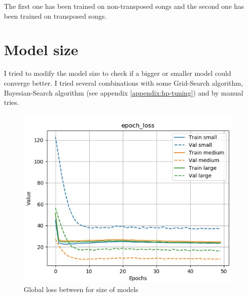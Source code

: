 \documentclass[12pt]{report}
\begin{document}
The first one has been trained on non-transposed songs and the second one has been trained on transposed songs.

\section{Model size}

I tried to modify the model size to check if a bigger or smaller model could converge better.
I tried several combinations with some Grid-Search algorithm, Bayesian-Search algorithm (see appendix \ref{appendix:hp-tuning}) and by manual tries.

\begin{figure}[htbp]
    \begin{minipage}{0.5\textwidth}
        \begin{center}
            \includegraphics[width=\textwidth]{images/experiences/size/loss-comparison-size.jpg}
            \caption{Global loss between for size of models}
            \label{fig:loss-comparison-size}
        \end{center}
    \end{minipage} \hfill
    \begin{minipage}{0.5 \textwidth}
        \begin{center}

\end{center}
\end{minipage}
\end{figure}
\end{document}
